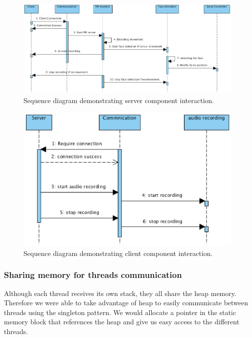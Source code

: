 \documentclass[11pt,a4paper,titlepage]{report}
\begin{document}
\begin{figure}
\centering
\includegraphics[width=\textwidth]{graphs/server-seq.png}
\caption{Sequence diagram demonstrating server component interaction.}
\label{fig:server-seq}
\end{figure}


\begin{figure}
\centering
\includegraphics[width=\textwidth]{graphs/client-seq.png}
\caption{Sequence diagram demonstrating client component interaction.}
\label{fig:client-seq}
\end{figure}




\subsubsection{Sharing memory for threads communication}


Although each thread receives its own stack, they all share the heap memory. Therefore we were able to take advantage of heap to easily communicate between threads using the singleton pattern. We would allocate a pointer in the static memory block that references the heap and give us easy access to the different threads. 
\end{document}
